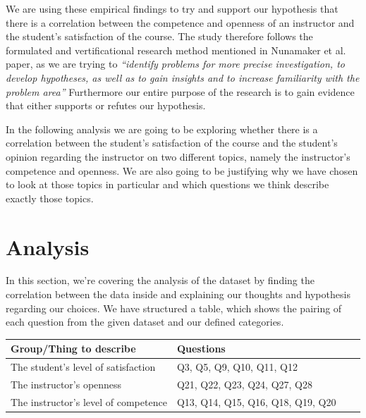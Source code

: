 \documentclass[twocolumn]{article}
\begin{document}
We are using these empirical findings to try and support our hypothesis that there is a correlation between the competence and openness of an instructor and the student’s satisfaction of the course. The study therefore follows the formulated and vertificational research method mentioned in Nunamaker et al. paper, as we are trying to \emph{“identify problems for more precise investigation, to develop hypotheses, as well as to gain insights and to increase familiarity with the problem area”} 
Furthermore our entire purpose of the research is to gain evidence that either supports or refutes our hypothesis\cite{Nuna}. 
 
In the following analysis we are going to be exploring whether there is a correlation between the student’s satisfaction of the course and the student’s opinion regarding the instructor on two different topics, namely the instructor’s competence and openness. We are also going to be justifying why we have chosen to look at those topics in particular and which questions we think describe exactly those topics.


\section{Analysis}\label{section-intersection}

In this section, we’re covering the analysis of the dataset by finding the correlation between the data inside and explaining our thoughts and hypothesis regarding our choices. 
We have structured a table, which shows the pairing of each question from the given dataset and our defined categories. 
\\
\begin{center}
\begin{tabular}{ |p{3cm}|p{3cm}|p{4cm}|p{4cm}|}
 
\hline
Group/Thing to describe & Questions \\
\hline
The student's level of satisfaction & Q3, Q5, Q9, Q10, Q11, Q12 \\
\hline
The instructor's openness & Q21, Q22, Q23, Q24, Q27, Q28  \\
\hline
The instructor's level of competence & Q13, Q14, Q15, Q16, Q18, Q19, Q20 \\
\hline
\end{tabular}
\end{center}
\\
\end{document}
